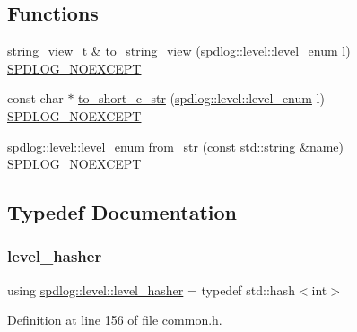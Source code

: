 \subsection*{Functions}
\begin{DoxyCompactItemize}
\item 
\hyperlink{namespacespdlog_af48e310b2f366ac6544701e6a3b56247}{string\+\_\+view\+\_\+t} \& \hyperlink{namespacespdlog_1_1level_a95af114ec4b98530113f98b5c7bc5ec7}{to\+\_\+string\+\_\+view} (\hyperlink{namespacespdlog_1_1level_a35f5227e5daf228d28a207b7b2aefc8b}{spdlog\+::level\+::level\+\_\+enum} l) \hyperlink{common_8h_a15d2dc432e6bb83beb5130be9a4ca8d6}{S\+P\+D\+L\+O\+G\+\_\+\+N\+O\+E\+X\+C\+E\+PT}
\item 
const char $\ast$ \hyperlink{namespacespdlog_1_1level_ac33524043deb648efa6d0a83bdcaeabc}{to\+\_\+short\+\_\+c\+\_\+str} (\hyperlink{namespacespdlog_1_1level_a35f5227e5daf228d28a207b7b2aefc8b}{spdlog\+::level\+::level\+\_\+enum} l) \hyperlink{common_8h_a15d2dc432e6bb83beb5130be9a4ca8d6}{S\+P\+D\+L\+O\+G\+\_\+\+N\+O\+E\+X\+C\+E\+PT}
\item 
\hyperlink{namespacespdlog_1_1level_a35f5227e5daf228d28a207b7b2aefc8b}{spdlog\+::level\+::level\+\_\+enum} \hyperlink{namespacespdlog_1_1level_aad88aa14232ac8b65ee62f8e5ad3df5a}{from\+\_\+str} (const std\+::string \&name) \hyperlink{common_8h_a15d2dc432e6bb83beb5130be9a4ca8d6}{S\+P\+D\+L\+O\+G\+\_\+\+N\+O\+E\+X\+C\+E\+PT}
\end{DoxyCompactItemize}


\subsection{Typedef Documentation}
\mbox{\label{namespacespdlog_1_1level_add7f1cc7c1914c6f6a6773cfbd1bb997}} 
\subsubsection{\texorpdfstring{level\+\_\+hasher}{level\_hasher}}
{\footnotesize\ttfamily using \hyperlink{namespacespdlog_1_1level_add7f1cc7c1914c6f6a6773cfbd1bb997}{spdlog\+::level\+::level\+\_\+hasher} = typedef std\+::hash$<$int$>$}



Definition at line 156 of file common.\+h.



